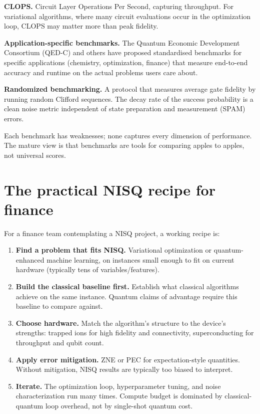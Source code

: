 \textbf{CLOPS.} Circuit Layer Operations Per Second, capturing throughput. For variational algorithms, where many circuit evaluations occur in the optimization loop, CLOPS may matter more than peak fidelity.

\textbf{Application-specific benchmarks.} The Quantum Economic Development Consortium (QED-C) and others have proposed standardised benchmarks for specific applications (chemistry, optimization, finance) that measure end-to-end accuracy and runtime on the actual problems users care about.

\textbf{Randomized benchmarking.} A protocol that measures average gate fidelity by running random Clifford sequences. The decay rate of the success probability is a clean noise metric independent of state preparation and measurement (SPAM) errors.

Each benchmark has weaknesses; none captures every dimension of performance. The mature view is that benchmarks are tools for comparing apples to apples, not universal scores.

\section{The practical NISQ recipe for finance}

For a finance team contemplating a NISQ project, a working recipe is:

\begin{enumerate}
  \item \textbf{Find a problem that fits NISQ.} Variational optimization or quantum-enhanced machine learning, on instances small enough to fit on current hardware (typically tens of variables/features).
  \item \textbf{Build the classical baseline first.} Establish what classical algorithms achieve on the same instance. Quantum claims of advantage require this baseline to compare against.
  \item \textbf{Choose hardware.} Match the algorithm's structure to the device's strengths: trapped ions for high fidelity and connectivity, superconducting for throughput and qubit count.
  \item \textbf{Apply error mitigation.} ZNE or PEC for expectation-style quantities. Without mitigation, NISQ results are typically too biased to interpret.
  \item \textbf{Iterate.} The optimization loop, hyperparameter tuning, and noise characterization run many times. Compute budget is dominated by classical-quantum loop overhead, not by single-shot quantum cost.
\end{enumerate}

